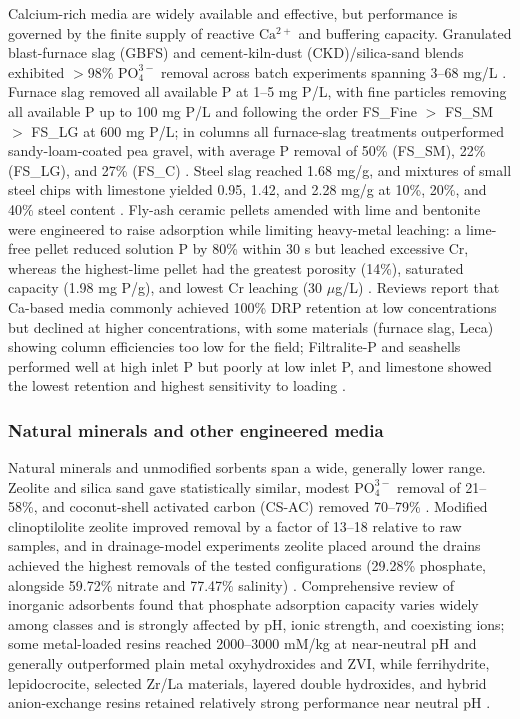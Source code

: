 Calcium-rich media are widely available and effective, but performance is governed by the finite supply of reactive $\mathrm{Ca^{2+}}$ and buffering capacity. Granulated blast-furnace slag (GBFS) and cement-kiln-dust (CKD)/silica-sand blends exhibited $>$98\% $\mathrm{PO_4^{3-}}$ removal across batch experiments spanning 3--68 mg/L \parencite{Agrawal2011}. Furnace slag removed all available P at 1--5 mg P/L, with fine particles removing all available P up to 100 mg P/L and following the order FS\_Fine $>$ FS\_SM $>$ FS\_LG at 600 mg P/L; in columns all furnace-slag treatments outperformed sandy-loam-coated pea gravel, with average P removal of 50\% (FS\_SM), 22\% (FS\_LG), and 27\% (FS\_C) \parencite{Sanford2016}. Steel slag reached 1.68 mg/g, and mixtures of small steel chips with limestone yielded 0.95, 1.42, and 2.28 mg/g at 10\%, 20\%, and 40\% steel content \parencite{Sellner2019b}. Fly-ash ceramic pellets amended with lime and bentonite were engineered to raise adsorption while limiting heavy-metal leaching: a lime-free pellet reduced solution P by 80\% within 30 s but leached excessive Cr, whereas the highest-lime pellet had the greatest porosity (14\%), saturated capacity (1.98 mg P/g), and lowest Cr leaching (30 $\mu$g/L) \parencite{Li2017}. Reviews report that Ca-based media commonly achieved 100\% DRP retention at low concentrations but declined at higher concentrations, with some materials (furnace slag, Leca) showing column efficiencies too low for the field; Filtralite-P and seashells performed well at high inlet P but poorly at low inlet P, and limestone showed the lowest retention and highest sensitivity to loading \parencite{Mendes2022,Pugliese2023}.

\subsubsection{Natural minerals and other engineered media}

Natural minerals and unmodified sorbents span a wide, generally lower range. Zeolite and silica sand gave statistically similar, modest $\mathrm{PO_4^{3-}}$ removal of 21--58\%, and coconut-shell activated carbon (CS-AC) removed 70--79\% \parencite{Agrawal2011}. Modified clinoptilolite zeolite improved removal by a factor of 13--18 relative to raw samples, and in drainage-model experiments zeolite placed around the drains achieved the highest removals of the tested configurations (29.28\% phosphate, alongside 59.72\% nitrate and 77.47\% salinity) \parencite{Sadeghi2021}. Comprehensive review of inorganic adsorbents found that phosphate adsorption capacity varies widely among classes and is strongly affected by pH, ionic strength, and coexisting ions; some metal-loaded resins reached 2000--3000 mM/kg at near-neutral pH and generally outperformed plain metal oxyhydroxides and ZVI, while ferrihydrite, lepidocrocite, selected Zr/La materials, layered double hydroxides, and hybrid anion-exchange resins retained relatively strong performance near neutral pH \parencite{Li2020}.

